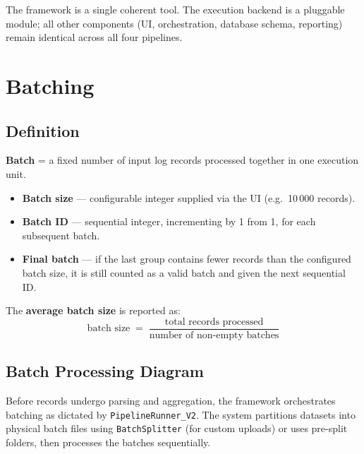 \documentclass[11pt,a4paper]{article}
\begin{document}
\begin{notebox}
The framework is a single coherent tool. The execution backend is a pluggable module; all other components (UI, orchestration, database schema, reporting) remain identical across all four pipelines.
\end{notebox}

\section{Batching}
\subsection{Definition}

\begin{tcolorbox}[basebox, colback=LightBg, colframe=AccentCyan,
                  title={Batch Definition}]
\textbf{Batch} = a fixed number of input log records processed together in one execution unit.

\begin{itemize}
  \item \textbf{Batch size} --- configurable integer supplied via the UI (e.g.\ 10\,000 records).
  \item \textbf{Batch ID} --- sequential integer, incrementing by 1 from 1, for each subsequent batch.
  \item \textbf{Final batch} --- if the last group contains fewer records than the configured batch size, it is still counted as a valid batch and given the next sequential ID.
\end{itemize}
\end{tcolorbox}

The \textbf{average batch size} is reported as:
\[
  {\text{batch size}} \;=\;
  \frac{\text{total records processed}}{\text{number of non-empty batches}}
\]

\subsection{Batch Processing Diagram}
Before records undergo parsing and aggregation, the framework orchestrates batching as dictated by \texttt{PipelineRunner\_V2}. The system partitions datasets into physical batch files using \texttt{BatchSplitter} (for custom uploads) or uses pre-split folders, then processes the batches sequentially.
\end{document}
